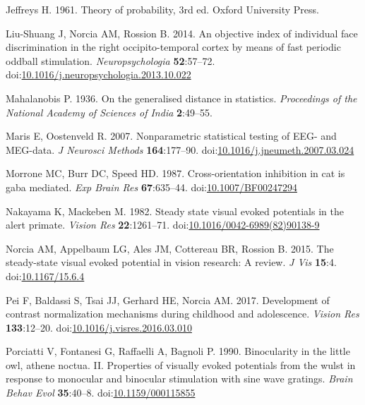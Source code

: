 \documentclass[]{article}
\begin{document}
\leavevmode\hypertarget{ref-Jeffreys1961}{}%
Jeffreys H. 1961. Theory of probability, 3rd ed. Oxford University Press.

\leavevmode\hypertarget{ref-Liu-Shuang2014}{}%
Liu-Shuang J, Norcia AM, Rossion B. 2014. An objective index of individual face discrimination in the right occipito-temporal cortex by means of fast periodic oddball stimulation. \emph{Neuropsychologia} \textbf{52}:57--72. doi:\href{https://doi.org/10.1016/j.neuropsychologia.2013.10.022}{10.1016/j.neuropsychologia.2013.10.022}

\leavevmode\hypertarget{ref-Mahalanobis1936}{}%
Mahalanobis P. 1936. On the generalised distance in statistics. \emph{Proceedings of the National Academy of Sciences of India} \textbf{2}:49--55.

\leavevmode\hypertarget{ref-Maris2007}{}%
Maris E, Oostenveld R. 2007. Nonparametric statistical testing of EEG- and MEG-data. \emph{J Neurosci Methods} \textbf{164}:177--90. doi:\href{https://doi.org/10.1016/j.jneumeth.2007.03.024}{10.1016/j.jneumeth.2007.03.024}

\leavevmode\hypertarget{ref-Morrone1987}{}%
Morrone MC, Burr DC, Speed HD. 1987. Cross-orientation inhibition in cat is gaba mediated. \emph{Exp Brain Res} \textbf{67}:635--44. doi:\href{https://doi.org/10.1007/BF00247294}{10.1007/BF00247294}

\leavevmode\hypertarget{ref-Nakayama1982}{}%
Nakayama K, Mackeben M. 1982. Steady state visual evoked potentials in the alert primate. \emph{Vision Res} \textbf{22}:1261--71. doi:\href{https://doi.org/10.1016/0042-6989(82)90138-9}{10.1016/0042-6989(82)90138-9}

\leavevmode\hypertarget{ref-Norcia2015}{}%
Norcia AM, Appelbaum LG, Ales JM, Cottereau BR, Rossion B. 2015. The steady-state visual evoked potential in vision research: A review. \emph{J Vis} \textbf{15}:4. doi:\href{https://doi.org/10.1167/15.6.4}{10.1167/15.6.4}

\leavevmode\hypertarget{ref-Pei2017}{}%
Pei F, Baldassi S, Tsai JJ, Gerhard HE, Norcia AM. 2017. Development of contrast normalization mechanisms during childhood and adolescence. \emph{Vision Res} \textbf{133}:12--20. doi:\href{https://doi.org/10.1016/j.visres.2016.03.010}{10.1016/j.visres.2016.03.010}

\leavevmode\hypertarget{ref-Porciatti1990}{}%
Porciatti V, Fontanesi G, Raffaelli A, Bagnoli P. 1990. Binocularity in the little owl, athene noctua. II. Properties of visually evoked potentials from the wulst in response to monocular and binocular stimulation with sine wave gratings. \emph{Brain Behav Evol} \textbf{35}:40--8. doi:\href{https://doi.org/10.1159/000115855}{10.1159/000115855}
\end{document}
